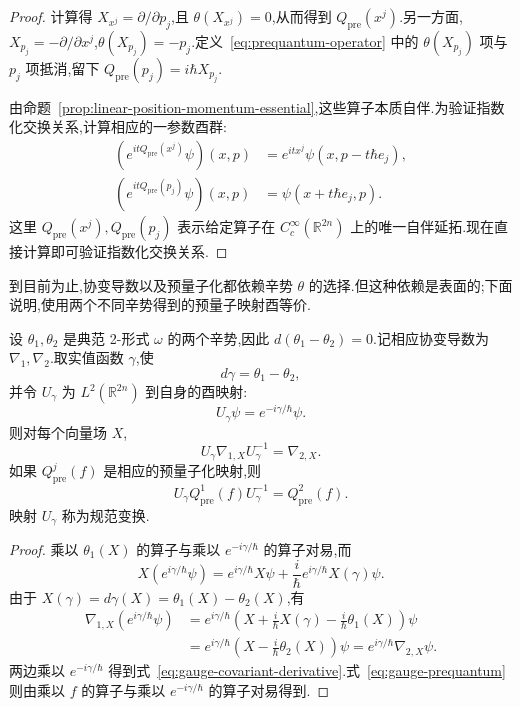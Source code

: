 \begin{proof}
计算得 $X_{x^j}=\partial/\partial p_j$,且 $\theta(X_{x^j})=0$,从而得到 $Q_{\mathrm{pre}}(x^j)$.另一方面,$X_{p_j}=-\partial/\partial x^j$,$\theta(X_{p_j})=-p_j$.定义~\eqref{eq:prequantum-operator} 中的 $\theta(X_{p_j})$ 项与 $p_j$ 项抵消,留下 $Q_{\mathrm{pre}}(p_j)=i\hbar X_{p_j}$.

由命题~\ref{prop:linear-position-momentum-essential},这些算子本质自伴.为验证指数化交换关系,计算相应的一参数酉群:
\[
\begin{aligned}
 (e^{itQ_{\mathrm{pre}}(x^j)}\psi)(x,p)
 &=e^{itx^j}\psi(x,p-t\hbar e_j),\\
 (e^{itQ_{\mathrm{pre}}(p_j)}\psi)(x,p)
 &=\psi(x+t\hbar e_j,p).\label{eq:prequantum-unitary-groups}
\end{aligned}
\]
这里 $Q_{\mathrm{pre}}(x^j),Q_{\mathrm{pre}}(p_j)$ 表示给定算子在 $C_c^\infty(\mathbb R^{2n})$ 上的唯一自伴延拓.现在直接计算即可验证指数化交换关系.
\end{proof}

到目前为止,协变导数以及预量子化都依赖辛势 $\theta$ 的选择.但这种依赖是表面的;下面说明,使用两个不同辛势得到的预量子映射酉等价.

\begin{proposition}[预量子化的规范变换]\label{prop:prequantum-gauge}
设 $\theta_1,\theta_2$ 是典范 2-形式 $\omega$ 的两个辛势,因此 $d(\theta_1-\theta_2)=0$.记相应协变导数为 $\nabla_1,\nabla_2$.取实值函数 $\gamma$,使
\[
 d\gamma=\theta_1-\theta_2,
\]
并令 $U_\gamma$ 为 $L^2(\mathbb R^{2n})$ 到自身的酉映射:
\[
 U_\gamma\psi=e^{-i\gamma/\hbar}\psi.
\]
则对每个向量场 $X$,
\[
 U_\gamma\nabla_{1,X}U_\gamma^{-1}=\nabla_{2,X}.\label{eq:gauge-covariant-derivative}
\]
如果 $Q_{\mathrm{pre}}^j(f)$ 是相应的预量子化映射,则
\[
 U_\gamma Q_{\mathrm{pre}}^1(f)U_\gamma^{-1}
 =Q_{\mathrm{pre}}^2(f).\label{eq:gauge-prequantum}
\]
映射 $U_\gamma$ 称为规范变换.
\end{proposition}

\begin{proof}
乘以 $\theta_1(X)$ 的算子与乘以 $e^{-i\gamma/\hbar}$ 的算子对易,而
\[
 X(e^{i\gamma/\hbar}\psi)
 =e^{i\gamma/\hbar}X\psi
 +\frac{i}{\hbar}e^{i\gamma/\hbar}X(\gamma)\psi.
\]
由于 $X(\gamma)=d\gamma(X)=\theta_1(X)-\theta_2(X)$,有
\[
\begin{aligned}
 \nabla_{1,X}(e^{i\gamma/\hbar}\psi)
 &=e^{i\gamma/\hbar}
 \left(X+\frac{i}{\hbar}X(\gamma)
 -\frac{i}{\hbar}\theta_1(X)\right)\psi\\
 &=e^{i\gamma/\hbar}
 \left(X-\frac{i}{\hbar}\theta_2(X)\right)\psi
 =e^{i\gamma/\hbar}\nabla_{2,X}\psi.
\end{aligned}
\]
两边乘以 $e^{-i\gamma/\hbar}$ 得到式~\eqref{eq:gauge-covariant-derivative}.式~\eqref{eq:gauge-prequantum} 则由乘以 $f$ 的算子与乘以 $e^{-i\gamma/\hbar}$ 的算子对易得到.
\end{proof}


